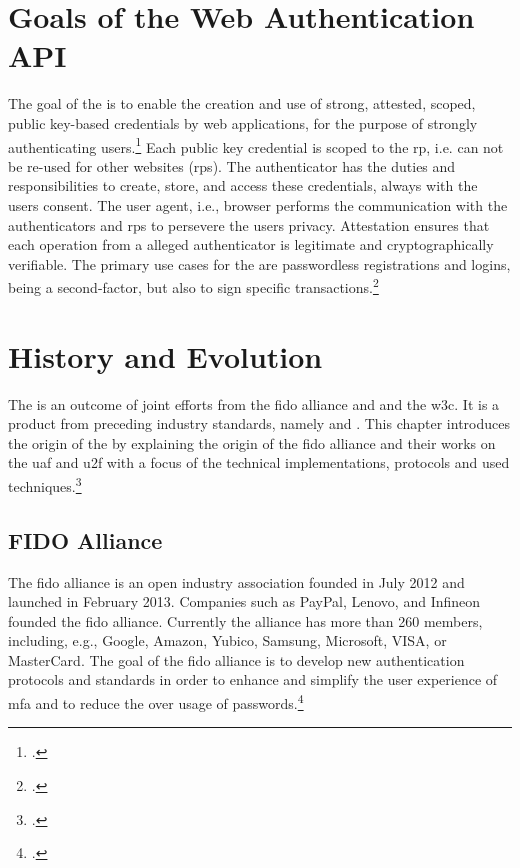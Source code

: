 
\section{Goals of the Web Authentication API}

The goal of the \wa{} is to enable \frqq the creation and use of strong, attested, scoped, public key-based credentials by web applications, for the purpose of strongly authenticating users\flqq.\footcites[][Abstract]{w3c} Each public key credential is scoped to the \gls{rp}, i.e. can not be re-used for other websites (\glspl{rp}). The authenticator has the 	duties and responsibilities to create, store, and access these credentials, always with the users consent. The user agent, i.e., browser performs the communication with the authenticators and \glspl{rp} to persevere the users privacy. Attestation ensures that each operation from a alleged authenticator is legitimate and cryptographically verifiable. The primary use cases for the \wa{} are passwordless registrations and logins, being a second-factor, but also to sign specific transactions.\footcites[See][Abstract, Chapter 1.2]{w3c}

\section{History and Evolution}

The \wa{} is an outcome of joint efforts from the \gls{fido} alliance and and the \gls{w3c}. It is a product from preceding industry standards, namely  and . This chapter introduces the origin of the \wa{} by explaining the origin of the \gls{fido} alliance and their works on the \gls{uaf} and \gls{u2f} with a focus of the technical implementations, protocols and used techniques.\footcites[See][24]{fido-ct-3}

\subsection{FIDO Alliance}
\label{subsec:fido_alliance}

The \gls{fido} alliance is an open industry association founded in July 2012 and launched in February 2013. Companies such as PayPal, Lenovo, and Infineon founded the \gls{fido} alliance. Currently the alliance has more than 260 members, including, e.g., Google, Amazon, Yubico, Samsung, Microsoft, VISA, or MasterCard. The goal of the \gls{fido} alliance is to develop new authentication protocols and standards in order to enhance and simplify the user experience of \gls{mfa} and to reduce the over usage of passwords.\footcites[See][583]{eckert-it-sec-9}[See][17]{fido-ct-2}

